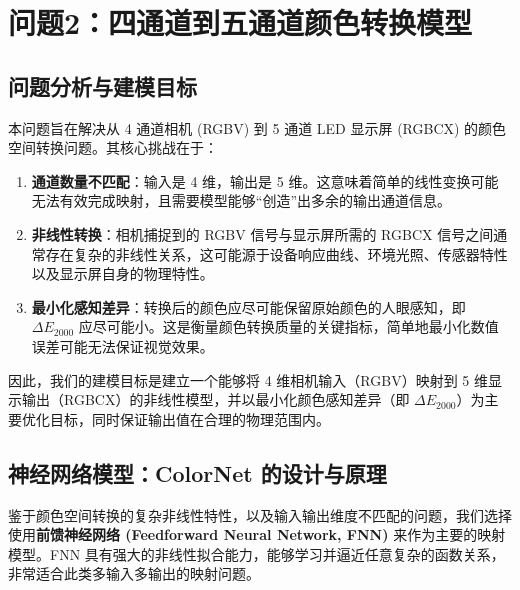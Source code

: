 \section[\hspace{-2pt}问题2：四通道到五通道颜色转换模型]{{\heiti{} \hspace{-8pt}问题2：四通道到五通道颜色转换模型}}\label{section3: 问题2：四通道到五通道颜色转换模型}
\subsection[\hspace{-2pt}问题分析与建模目标]{{\heiti{} \hspace{-8pt}问题分析与建模目标}}\label{section2: 问题分析与建模目标}

本问题旨在解决从 4 通道相机 (RGBV) 到 5 通道 LED 显示屏 (RGBCX) 的颜色空间转换问题。其核心挑战在于：
\begin{enumerate}
    \item \textbf{通道数量不匹配}：输入是 4 维，输出是 5 维。这意味着简单的线性变换可能无法有效完成映射，且需要模型能够“创造”出多余的输出通道信息。
    \item \textbf{非线性转换}：相机捕捉到的 RGBV 信号与显示屏所需的 RGBCX 信号之间通常存在复杂的非线性关系，这可能源于设备响应曲线、环境光照、传感器特性以及显示屏自身的物理特性。
    \item \textbf{最小化感知差异}：转换后的颜色应尽可能保留原始颜色的人眼感知，即 $\Delta E_{2000}$ 应尽可能小。这是衡量颜色转换质量的关键指标，简单地最小化数值误差可能无法保证视觉效果。
\end{enumerate}

因此，我们的建模目标是建立一个能够将 4 维相机输入（RGBV）映射到 5 维显示输出（RGBCX）的非线性模型，并以最小化颜色感知差异（即 $\Delta E_{2000}$）为主要优化目标，同时保证输出值在合理的物理范围内。

\subsection[\hspace{-2pt}神经网络模型：ColorNet 的设计与原理]{{\heiti{} \hspace{-8pt}神经网络模型：ColorNet 的设计与原理}}\label{section2: 神经网络模型}

鉴于颜色空间转换的复杂非线性特性，以及输入输出维度不匹配的问题，我们选择使用\textbf{前馈神经网络 (Feedforward Neural Network, FNN)} 来作为主要的映射模型。FNN 具有强大的非线性拟合能力，能够学习并逼近任意复杂的函数关系，非常适合此类多输入多输出的映射问题。


